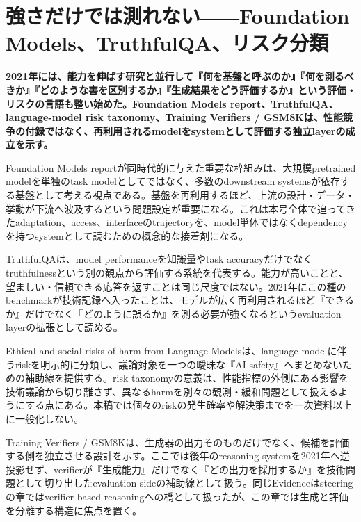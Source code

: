 \section{強さだけでは測れない――Foundation Models、TruthfulQA、リスク分類}
\noindent\textbf{2021年には、能力を伸ばす研究と並行して『何を基盤と呼ぶのか』『何を測るべきか』『どのような害を区別するか』『生成結果をどう評価するか』という評価・リスクの言語も整い始めた。Foundation Models report、TruthfulQA、language-model risk taxonomy、Training Verifiers / GSM8Kは、性能競争の付録ではなく、再利用されるmodelをsystemとして評価する独立layerの成立を示す。}\autocite{src-20fd9bba2e7a,src-34f845c1e710,src-750bc3eeb1bc,src-8536f9ceae6d,src-c16f4ae139bf,src-d9549fe4ff37}

Foundation Models reportが同時代的に与えた重要な枠組みは、大規模pretrained modelを単独のtask modelとしてではなく、多数のdownstream systemsが依存する基盤として考える視点である。基盤を再利用するほど、上流の設計・データ・挙動が下流へ波及するという問題設定が重要になる。これは本号全体で追ってきたadaptation、access、interfaceのtrajectoryを、model単体ではなくdependencyを持つsystemとして読むための概念的な接着剤になる。\autocite{src-d9549fe4ff37}


TruthfulQAは、model performanceを知識量やtask accuracyだけでなくtruthfulnessという別の観点から評価する系統を代表する。能力が高いことと、望ましい・信頼できる応答を返すことは同じ尺度ではない。2021年にこの種のbenchmarkが技術記録へ入ったことは、モデルが広く再利用されるほど『できるか』だけでなく『どのように誤るか』を測る必要が強くなるというevaluation layerの拡張として読める。\autocite{src-8536f9ceae6d,src-c16f4ae139bf}


Ethical and social risks of harm from Language Modelsは、language modelに伴うriskを明示的に分類し、議論対象を一つの曖昧な『AI safety』へまとめないための補助線を提供する。risk taxonomyの意義は、性能指標の外側にある影響を技術議論から切り離さず、異なるharmを別々の観測・緩和問題として扱えるようにする点にある。本稿では個々のriskの発生確率や解決策までを一次資料以上に一般化しない。\autocite{src-20fd9bba2e7a}


Training Verifiers / GSM8Kは、生成器の出力そのものだけでなく、候補を評価する側を独立させる設計を示す。ここでは後年のreasoning systemを2021年へ逆投影せず、verifierが『生成能力』だけでなく『どの出力を採用するか』を技術問題として切り出したevaluation-sideの補助線として扱う。同じEvidenceはsteeringの章ではverifier-based reasoningへの橋として扱ったが、この章では生成と評価を分離する構造に焦点を置く。\autocite{src-34f845c1e710,src-750bc3eeb1bc}


